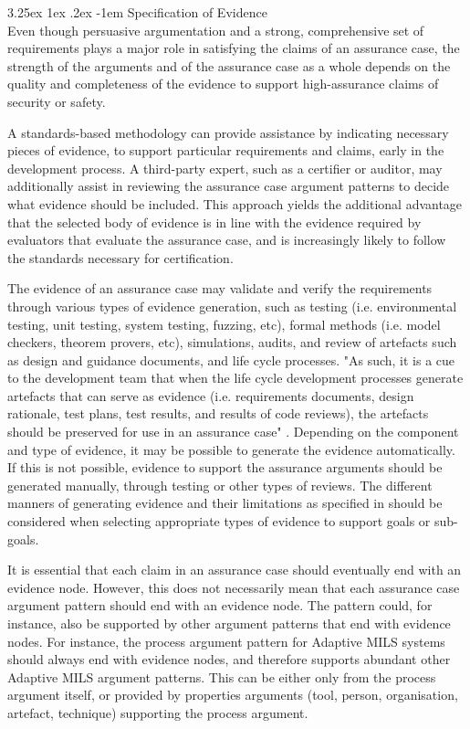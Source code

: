 \documentclass[12pt,twoside,a4paper]{article}
\makeatletter
\renewcommand\paragraph{\@startsection{paragraph}{5}{\z@}%
  {3.25ex \@plus1ex \@minus.2ex}%
  {-1em}%
  {\normalfont\normalsize\bfseries}}
\makeatother
\begin{document}
\paragraph{Specification of Evidence}\label{sec:specificationofevidence}
~\\
Even though persuasive argumentation and a strong, comprehensive set of requirements plays a major role in satisfying the claims of an assurance case, the strength of the arguments and of the assurance case as a whole depends on the quality and completeness of the evidence to support high-assurance claims of security or safety. 

A standards-based methodology can provide assistance by indicating necessary pieces of evidence, to support particular requirements and claims, early in the development process. A third-party expert, such as a certifier or auditor, may additionally assist in reviewing the assurance case argument patterns to decide what evidence should be included. This approach yields the additional advantage that the selected body of evidence is in line with the evidence required by evaluators that evaluate the assurance case, and is increasingly likely to follow the standards necessary for certification.

The evidence of an assurance case may validate and verify the requirements through various types of evidence generation, such as testing (i.e. environmental testing, unit testing, system testing, fuzzing, etc), formal methods (i.e. model checkers, theorem provers, etc), simulations, audits, and review of artefacts such as design and guidance documents, and life cycle processes. "As such, it is a cue to the development team that when the life cycle development processes generate artefacts that can serve as evidence (i.e. requirements documents, design rationale, test plans, test results, and results of code reviews), the artefacts should be preserved for use in an assurance case" \cite{Lipson13evidence-of-assurance}. Depending on the component and type of evidence, it may be possible to generate the evidence automatically. If this is not possible, evidence to support the assurance arguments should be generated manually, through testing or other types of reviews. The different manners of generating evidence and their limitations as specified in \cite{Hawkins12framework-sufficiency} should be considered when selecting appropriate types of evidence to support goals or sub-goals. 

It is essential that each claim in an assurance case should eventually end with an evidence node. However, this does not necessarily mean that each assurance case argument pattern should end with an evidence node. The pattern could, for instance, also be supported by other argument patterns that end with evidence nodes. For instance, the process argument pattern for Adaptive MILS systems should always end with evidence nodes, and therefore supports abundant other Adaptive MILS argument patterns. This can be either only from the process argument itself, or provided by properties arguments (tool, person, organisation, artefact, technique) supporting the process argument. 
\end{document}
